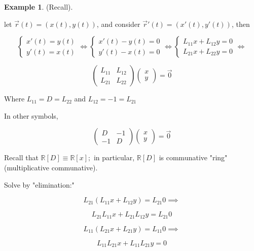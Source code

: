 \documentclass[12pt,a4paper]{article}
\theoremstyle{definition}
\newtheorem*{example}{Example}
\begin{document}

\begin{example}
  (Recall). 

  let \( \vec{r}(t) = (x(t), y(t))\), and consider \( \vec{r}'(t) =
  (x'(t), y'(t)) \), then 

  \[
  \begin{cases}
    x'(t) = y(t) \\
    y'(t) = x(t)
  \end{cases}
  \iff
  \begin{cases}
    x'(t) - y(t) =0 \\
    y'(t) - x(t) =0
  \end{cases}
  \iff
  \begin{cases}
    L_{11}x + L_{12}y = 0 \\
    L_{21}x + L_{22}y = 0
  \end{cases}
  \iff
  \]

  \[
  \begin{pmatrix}
    L_{11} & L_{12} \\
    L_{21} & L_{22}
  \end{pmatrix}
  \begin{pmatrix}
    x \\
    y
  \end{pmatrix}
  = 
  \vec{0}
  \]

  Where \( L_{11} = D = L_{22} \) and \( L_{12} = -1 = L_{21} \) 

  In other symbols, 

  \[ 
  \begin{pmatrix}
    D & -1 \\
    -1 & D
  \end{pmatrix}
  \begin{pmatrix}
    x \\
    y
  \end{pmatrix}
  = 
  \vec{0}
  \]

  Recall that \( \mathbb{R}[D] \equiv \mathbb{R}[x]; \) in particular,
  \( \mathbb{R}[D] \) is communative "ring" (multiplicative
  communative).

  Solve by "elimination:"

  \[ L_{21}(L_{11}x + L_{12}y) = L_{21}0 \implies \]

  \[ L_{21}L_{11}x + L_{21}L_{12}y = L_{21}0 \]

  \[ L_{11}(L_{21}x + L_{21}y) = L_{11}0 \implies  \]

  \[ L_{11}L_{21}x + L_{11}L_{21}y = 0 \]


\end{example}
\end{document}
